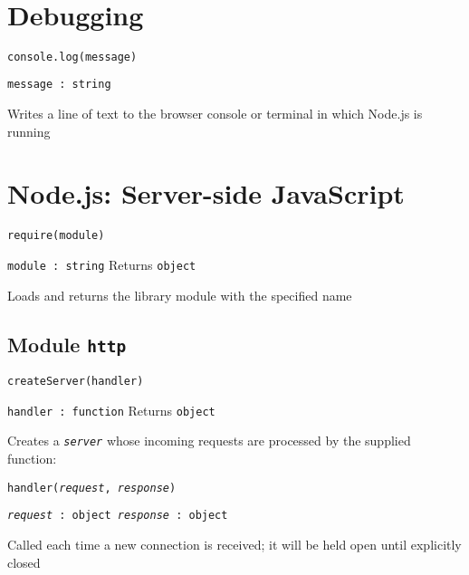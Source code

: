 \documentclass[12pt,letterpaper]{article}
\newcommand{\texttit}[1]{\texttt{\textit{#1}}}
\newenvironment{itemize*}%
	{\begin{itemize}%
		\setlength{\itemsep}{0pt}%
		\setlength{\parskip}{0pt}%
		\footnotesize%
	}%
	{\end{itemize}}
\begin{document}
\noindent
{} \\

\section*{Debugging}

\texttt{console.log(message)}
\begin{itemize*}
\item[] \texttt{message :\ string}
\item[] Writes a line of text to the browser console or terminal in which Node.js is running
\end{itemize*}

\section*{Node.js: Server-side JavaScript}

\texttt{require(module)}
\begin{itemize*}
\item[] \texttt{module :\ string} \qquad Returns \texttt{object}
\item[] Loads and returns the library module with the specified name
\end{itemize*}

\subsection*{Module \texttt{http}}

\vspace{-18pt}
\begin{multicols}{2}
\texttt{createServer(handler)}
\begin{itemize*}
\item[] \texttt{handler :\ \textnormal{function}} \qquad Returns \texttt{object}
\item[] Creates a \texttit{server} whose incoming requests are processed by the supplied function:
\end{itemize*}
\columnbreak
\texttt{handler(\textit{request}, \textit{response})}
\begin{itemize*}
\item[] \texttt{\textit{request} :\ object \quad \textit{response} :\ object}
\item[] Called each time a new connection is received; it will be held open until explicitly closed
\end{itemize*}
\end{multicols}
\end{document}
